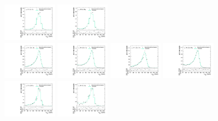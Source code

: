 \begin{figure}[htpb]
  \includegraphics[width=0.2\textwidth]{fig/analysisAppendix/templateVsReco_WprToWH2000_r0_MJ_mu_HP_bb_HDy.pdf}
  \includegraphics[width=0.2\textwidth]{fig/analysisAppendix/templateVsReco_WprToWH2000_r0_MJ_mu_LP_bb_HDy.pdf}\\
  \includegraphics[width=0.2\textwidth]{fig/analysisAppendix/templateVsReco_WprToWH2000_r0_MJ_mu_HP_nobb_LDy.pdf}
  \includegraphics[width=0.2\textwidth]{fig/analysisAppendix/templateVsReco_WprToWH2000_r0_MJ_mu_LP_nobb_LDy.pdf}
  \includegraphics[width=0.2\textwidth]{fig/analysisAppendix/templateVsReco_WprToWH2000_r0_MJ_mu_HP_nobb_HDy.pdf}
  \includegraphics[width=0.2\textwidth]{fig/analysisAppendix/templateVsReco_WprToWH2000_r0_MJ_mu_LP_nobb_HDy.pdf}\\
  \includegraphics[width=0.2\textwidth]{fig/analysisAppendix/templateVsReco_WprToWH2000_r0_MJ_mu_HP_vbf_LDy.pdf}
  \includegraphics[width=0.2\textwidth]{fig/analysisAppendix/templateVsReco_WprToWH2000_r0_MJ_mu_LP_vbf_LDy.pdf}

\end{figure}
